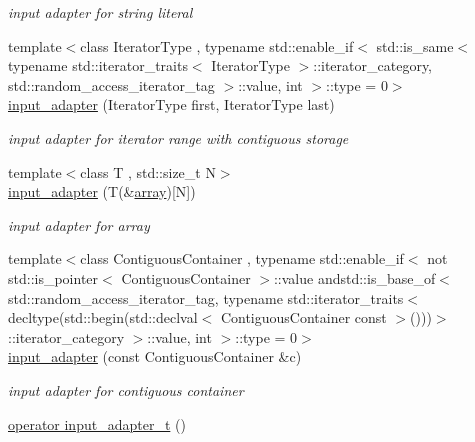\begin{DoxyCompactItemize}
\begin{DoxyCompactList}\small\item\em input adapter for string literal \end{DoxyCompactList}\item 
{\footnotesize template$<$class Iterator\+Type , typename std\+::enable\+\_\+if$<$ std\+::is\+\_\+same$<$ typename std\+::iterator\+\_\+traits$<$ Iterator\+Type $>$\+::iterator\+\_\+category, std\+::random\+\_\+access\+\_\+iterator\+\_\+tag $>$\+::value, int $>$\+::type  = 0$>$ }\\\hyperlink{classnlohmann_1_1detail_1_1input__adapter_ad6824b0f792691f75186c527fa31a6b4}{input\+\_\+adapter} (Iterator\+Type first, Iterator\+Type last)
\begin{DoxyCompactList}\small\item\em input adapter for iterator range with contiguous storage \end{DoxyCompactList}\item 
{\footnotesize template$<$class T , std\+::size\+\_\+t N$>$ }\\\hyperlink{classnlohmann_1_1detail_1_1input__adapter_aa2392138bf8307df1994dc7eb22d51ce}{input\+\_\+adapter} (T(\&\hyperlink{namespacenlohmann_1_1detail_a90aa5ef615aa8305e9ea20d8a947980faf1f713c9e000f5d3f280adbd124df4f5}{array})\mbox{[}N\mbox{]})
\begin{DoxyCompactList}\small\item\em input adapter for array \end{DoxyCompactList}\item 
{\footnotesize template$<$class Contiguous\+Container , typename std\+::enable\+\_\+if$<$ not std\+::is\+\_\+pointer$<$ Contiguous\+Container $>$\+::value andstd\+::is\+\_\+base\+\_\+of$<$ std\+::random\+\_\+access\+\_\+iterator\+\_\+tag, typename std\+::iterator\+\_\+traits$<$ decltype(std\+::begin(std\+::declval$<$ Contiguous\+Container const  $>$()))$>$\+::iterator\+\_\+category $>$\+::value, int $>$\+::type  = 0$>$ }\\\hyperlink{classnlohmann_1_1detail_1_1input__adapter_a6f92fe82cb49a508dbfb297c5630cc7f}{input\+\_\+adapter} (const Contiguous\+Container \&c)
\begin{DoxyCompactList}\small\item\em input adapter for contiguous container \end{DoxyCompactList}\item 
\hyperlink{classnlohmann_1_1detail_1_1input__adapter_a4ef04b9490247fc38f3d1c2a9e18789b}{operator input\+\_\+adapter\+\_\+t} ()
\end{DoxyCompactItemize}


